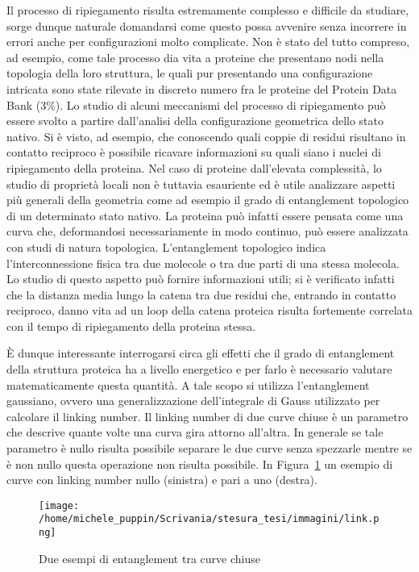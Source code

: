 Il processo di ripiegamento risulta estremamente complesso e difficile da studiare, sorge dunque naturale domandarsi come questo possa avvenire senza incorrere in errori anche per configurazioni molto complicate. Non è stato del tutto compreso, ad esempio, come tale processo dia vita a proteine che presentano nodi nella topologia della loro struttura, le quali pur presentando una configurazione intricata sono state rilevate in discreto numero fra le proteine del Protein Data Bank (3\%). \cite{Jackson2017HowTF}
Lo studio di alcuni meccanismi del processo di ripiegamento può essere svolto a partire dall'analisi della configurazione geometrica dello stato nativo. Si è visto, ad esempio, che  conoscendo quali coppie di residui risultano in contatto reciproco è possibile ricavare informazioni su quali siano i nuclei di ripiegamento della proteina. \cite{lunghezza}
Nel caso di proteine dall'elevata complessità, lo studio di proprietà locali non è tuttavia esauriente ed è utile analizzare aspetti più generali della geometria come ad esempio il grado di entanglement topologico di un determinato stato nativo. La proteina può infatti essere pensata come una curva che, deformandosi necessariamente in modo continuo, può essere analizzata con studi di natura topologica. L'entanglement topologico indica l'interconnessione fisica tra due molecole o tra due parti di una stessa molecola. 
Lo studio di questo aspetto può fornire informazioni utili; si è verificato infatti che la distanza media lungo la 
catena tra due residui che, entrando in contatto reciproco, danno vita ad un loop della catena proteica risulta fortemente correlata con il tempo di ripiegamento della proteina stessa. \cite{lunghezza}

È dunque interessante interrogarsi circa gli effetti che il grado di entanglement della struttura proteica ha a livello energetico e per farlo è necessario valutare matematicamente questa quantità. A tale scopo si utilizza l'entanglement gaussiano, ovvero una generalizzazione dell'integrale di Gauss utilizzato per calcolare il linking number. \cite{preprint}
Il linking number di due curve chiuse è un parametro che descrive quante volte una curva gira attorno all'altra. In generale se tale parametro è nullo risulta possibile separare le due curve senza spezzarle mentre se è non nullo questa operazione non risulta possibile. In Figura~\ref{fig:link} un esempio di curve con linking number nullo (sinistra) e pari a uno (destra).
\begin{figure}[h]
	\centering	\texttt{[image: /home/michele\_puppin/Scrivania/stesura\_tesi/immagini/link.png]}
	\caption{Due esempi di entanglement tra curve chiuse}
	\label{fig:link}
\end{figure}

